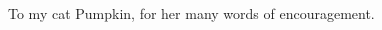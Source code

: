 \cleardoublepage
\thispagestyle{empty} %

\vspace*{8cm} 

\hfill
\begin{parbox}{0.6\textwidth}{
\begin{flushright}

To my cat Pumpkin, for her many words of encouragement. 

\end{flushright}}
\end{parbox}



